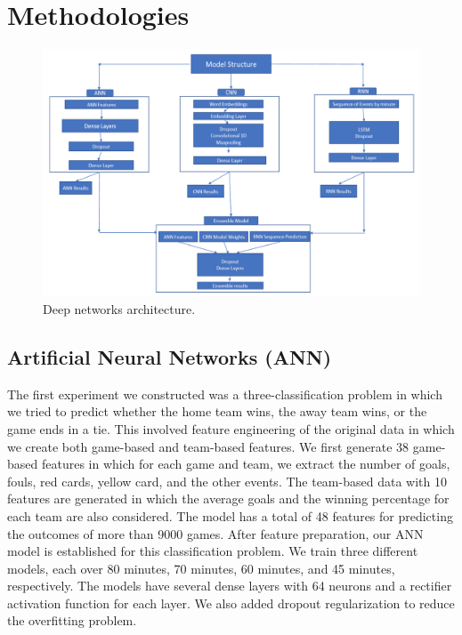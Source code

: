 \documentclass[11pt,a4paper]{article}
\begin{document}
\section{Methodologies}

\begin{figure}
\includegraphics[width=\textwidth]{./img/fig-1.png}
\caption{\label{model-figure} Deep networks architecture.}
\end{figure}

\subsection{Artificial Neural Networks (ANN)}

The first experiment we constructed was a three-classification problem in which we tried to predict whether the home team wins, the away team wins, or the game ends in a tie. This involved feature engineering of the original data in which we create both game-based and team-based features. We first generate 38 game-based features in which for each game and team, we extract the number of goals, fouls, red cards, yellow card, and the other events. The team-based data with 10 features are generated in which the average goals and the winning percentage for each team are also considered. The model has a total of 48 features for predicting the outcomes of more than 9000 games. After feature preparation, our ANN model is established for this classification problem. We train three different models, each over 80 minutes, 70 minutes, 60 minutes, and 45 minutes, respectively. The models have several dense layers with 64 neurons and a rectifier activation function for each layer. We also added dropout regularization to reduce the overfitting problem.
\end{document}
